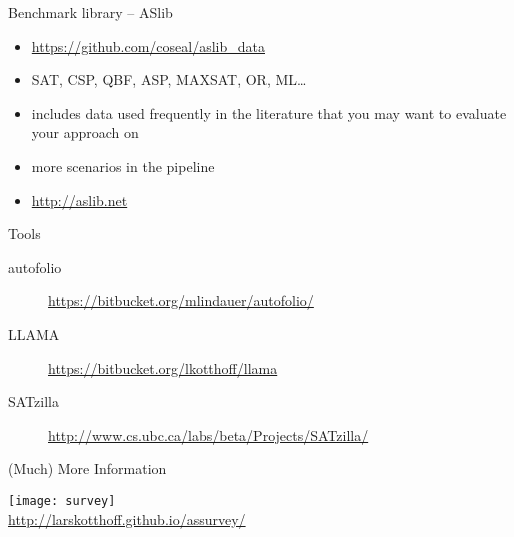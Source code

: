 \begin{frame}[c]{Benchmark library -- ASlib }
\begin{itemize}
\item \url{https://github.com/coseal/aslib_data}
\item SAT, CSP, QBF, ASP, MAXSAT, OR, ML\ldots
\item includes data used frequently in the literature that you may want to
    evaluate your approach on
\item more scenarios in the pipeline
\item \url{http://aslib.net}\\[1em]
\end{itemize}
\end{frame}

\begin{frame}[c]{Tools}
\begin{description}
\item[autofolio] \url{https://bitbucket.org/mlindauer/autofolio/}
\item[LLAMA] \url{https://bitbucket.org/lkotthoff/llama}
\item[SATzilla]
 \footnotesize{\url{http://www.cs.ubc.ca/labs/beta/Projects/SATzilla/}}
\end{description}
\end{frame}

\begin{frame}[c]{(Much) More Information }
\begin{center}
\texttt{[image: survey]}\\
\url{http://larskotthoff.github.io/assurvey/}
\end{center}
\end{frame}


